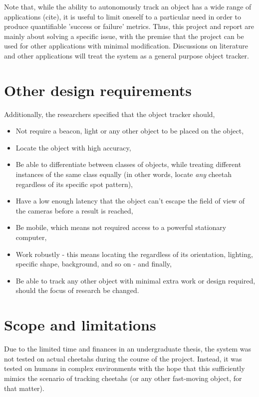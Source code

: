 Note that, while the ability to autonomously track an object has a wide range of applications {\color{red} (cite)}, it is useful to limit oneself to a particular need in order to produce quantifiable 'success or failure' metrics. Thus, this project and report are mainly about solving a specific issue, with the premise that the project can be used for other applications with minimal modification. Discussions on literature and other applications will treat the system as a general purpose object tracker.


\section{Other design requirements}
Additionally, the researchers specified that the object tracker should,

\begin{itemize}
	\item Not require a beacon, light or any other object to be placed on the object,
	\item Locate the object with high accuracy,
	\item Be able to differentiate between classes of objects, while treating different instances of the same class equally (in other words, locate \emph{any} cheetah regardless of its specific spot pattern),
	\item Have a low enough latency that the object can't escape the field of view of the cameras before a result is reached,
	\item Be mobile, which means not required access to a powerful stationary computer,
	\item Work robustly - this means locating the regardless of its orientation, lighting, specific shape, background, and so on - and finally,
	\item Be able to track any other object with minimal extra work or design required, should the focus of research be changed.
\end{itemize}


\section{Scope and limitations}
Due to the limited time and finances in an undergraduate thesis, the system was not tested on actual cheetahs during the course of the project. Instead, it was tested on humans in complex environments with the hope that this sufficiently mimics the scenario of tracking cheetahs (or any other fast-moving object, for that matter).

